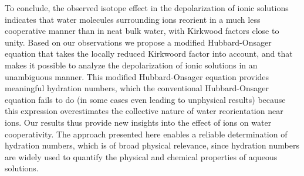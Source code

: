 To conclude, the observed isotope effect in the depolarization of ionic solutions indicates that water molecules surrounding ions reorient in a much less cooperative manner than in neat bulk water, with Kirkwood factors close to unity. Based on our observations we propose a modified Hubbard-Onsager equation that takes the locally reduced Kirkwoord factor into account, and that makes it possible to analyze the depolarization of ionic solutions in an unambiguous manner.  This modified Hubbard-Onsager equation provides meaningful hydration numbers, which the conventional Hubbard-Onsager equation fails to do (in some cases even leading to unphysical results) because this expression overestimates the collective nature of water reorientation near ions. Our results thus provide new insights into the effect of ions on water cooperativity. The approach presented here enables a reliable determination of hydration numbers, which is of broad physical relevance, since hydration numbers are widely used to quantify the physical and chemical properties of aqueous solutions.


